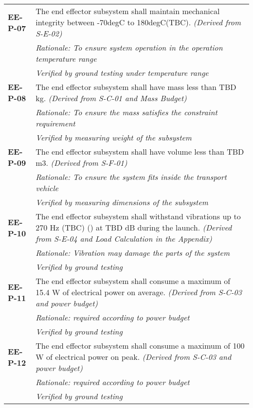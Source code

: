 \begin{longtable}{P{2cm}P{13.25cm}}
\textbf{EE-P-07}	&
The end effector subsystem shall maintain mechanical integrity between -70\gls{degC} to 180\gls{degC}(\gls{TBC}).
\textit{(Derived from S-E-02)}	\\
& \textit{Rationale: To ensure system operation in the operation temperature range} \\
& \textit{Verified by ground testing under temperature range}	\\

\textbf{EE-P-08}	&
The end effector subsystem shall have mass less than \gls{TBD} \gls{kg}.
\textit{(Derived from S-C-01 and Mass Budget)}	\\
& \textit{Rationale: To ensure the mass satisfies the constraint requirement} \\
& \textit{Verified by measuring weight of the subsystem}	\\

\textbf{EE-P-09}	&
The end effector subsystem shall have volume less than \gls{TBD} \gls{m3}.
\textit{(Derived from S-F-01)}	\\
& \textit{Rationale: To ensure the system fits inside the transport vehicle} \\
& \textit{Verified by measuring dimensions of the subsystem}	\\

\textbf{EE-P-10}	&
The end effector subsystem shall withstand vibrations up to 270 \gls{Hz} (\gls{TBC}) () at \gls{TBD} \gls{dB} during the launch. 
\textit{(Derived from S-E-04 and Load Calculation in the Appendix)}	\\
& \textit{Rationale: Vibration may damage the parts of the system} \\
& \textit{Verified by ground testing}	\\


\textbf{EE-P-11}	& The end effector subsystem shall consume a maximum of 15.4 \gls{W} of electrical power on average.
\textit{(Derived from S-C-03 and power budget)}	\\
& \textit{Rationale: required according to power budget} \\
& \textit{Verified by ground testing}	\\

\textbf{EE-P-12}	& The end effector subsystem shall consume a maximum of 100 \gls{W} of electrical power on peak. 
\textit{(Derived from S-C-03 and power budget)}	\\
& \textit{Rationale: required according to power budget} \\
&  \textit{Verified by ground testing}	\\


\end{longtable}
